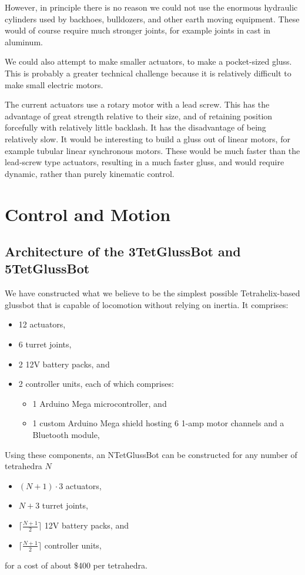 \documentclass[11pt]{article}
\begin{document}
However, in principle there is no reason we could not use the enormous hydraulic cylinders
used by backhoes, bulldozers, and other earth moving equipment. These would of course require much
stronger joints, for example joints in cast in aluminum.

We could also attempt to make smaller actuators, to make a pocket-sized gluss. This is probably
a greater technical challenge because it is relatively difficult to make small electric motors.

The current actuators use a rotary motor with a lead screw. This has the advantage of great
strength relative to their size, and of retaining position forcefully with relatively little backlash. It has the disadvantage
of being relatively slow. It would be interesting to build a gluss out of linear motors, for
example tubular linear synchronous motors. These would be much faster than the lead-screw type
actuators, resulting in a much faster gluss, and would require dynamic, rather than purely kinematic control.  

\section{Control and Motion}
\subsection{Architecture of the 3TetGlussBot and 5TetGlussBot}

We have constructed what we believe to be the simplest possible Tetrahelix-based glussbot that is capable of locomotion
without relying on inertia.
It comprises:
\begin{itemize}  
\item 12 actuators,
\item 6 turret joints,
\item 2 12V battery packs, and
\item 2 controller units, each of which comprises:
\begin{itemize}  
\item 1 Arduino Mega microcontroller, and
\item 1 custom Arduino Mega shield hosting 6 1-amp motor channels and a Bluetooth module,
\end{itemize}  
\end{itemize}

Using these components, an NTetGlussBot can be constructed for any number of tetrahedra $N$

\begin{itemize}  
\item $(N + 1)\cdot 3$  actuators,
\item $N+3$ turret joints,
\item $\lceil \frac{N + 1}{2} \rceil$ 12V battery packs, and
\item $\lceil \frac{N + 1}{2} \rceil$ controller units,
\end{itemize}
for a cost of about \$400 per tetrahedra.
\end{document}
